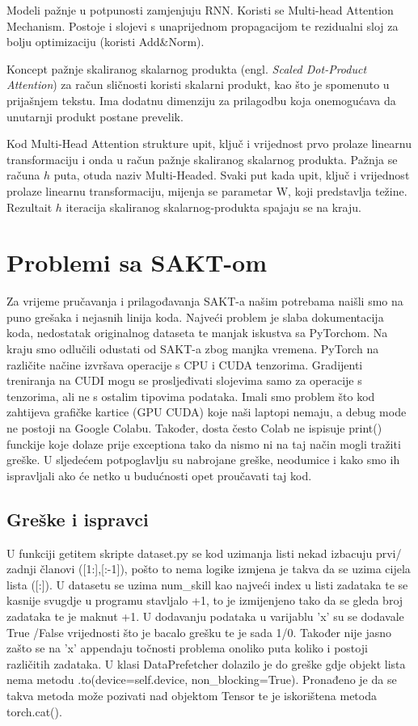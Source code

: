 	Modeli pažnje u potpunosti zamjenjuju RNN. Koristi se Multi-head Attention Mechanism. Postoje i slojevi s unaprijednom propagacijom te rezidualni sloj za bolju optimizaciju (koristi Add\&Norm).

	Koncept pažnje skaliranog skalarnog produkta (engl. \textit{Scaled Dot-Product Attention}) za račun sličnosti koristi skalarni produkt, kao što je spomenuto u prijašnjem tekstu. Ima dodatnu dimenziju za prilagodbu koja onemogućava da unutarnji produkt postane prevelik.

	Kod Multi-Head Attention strukture upit, ključ i vrijednost prvo prolaze linearnu transformaciju i onda u račun pažnje skaliranog skalarnog produkta. Pažnja se računa $h$ puta, otuda naziv Multi-Headed.  Svaki put kada upit, ključ i vrijednost prolaze linearnu transformaciju, mijenja se parametar W, koji predstavlja težine. Rezultait $h$ iteracija skaliranog skalarnog-produkta spajaju se na kraju.


	\section{Problemi sa SAKT-om}
	Za vrijeme pručavanja i prilagođavanja SAKT-a našim potrebama naišli smo na puno grešaka i nejasnih linija koda. Najveći problem je slaba dokumentacija koda, nedostatak originalnog dataseta te manjak iskustva sa PyTorchom.
	Na kraju smo odlučili odustati od SAKT-a zbog manjka vremena. PyTorch na različite načine izvršava operacije s CPU i CUDA tenzorima. Gradijenti treniranja na CUDI mogu se prosljeđivati slojevima samo za operacije s tenzorima, ali ne s ostalim tipovima podataka. Imali smo problem što kod zahtijeva grafičke kartice (GPU CUDA) koje naši laptopi nemaju, a debug mode ne postoji na Google Colabu. Također, dosta često Colab ne ispisuje print() funckije koje dolaze prije exceptiona tako da nismo ni na taj način mogli tražiti greške. U sljedećem potpoglavlju su nabrojane greške, neodumice i kako smo ih ispravljali ako će netko u budućnosti opet proučavati taj kod.
	\subsection{Greške i ispravci}
	
		U funkciji getitem skripte dataset.py se kod uzimanja listi nekad izbacuju prvi/ zadnji članovi ([1:],[:-1]), pošto to nema logike izmjena je takva da se uzima cijela lista ([:]). U datasetu se uzima num\_skill kao najveći index u listi zadataka te se kasnije svugdje u programu stavljalo +1, to je izmijenjeno tako da se gleda broj zadataka te je maknut +1. U dodavanju podataka u varijablu 'x' su se dodavale True /False vrijednosti što je bacalo grešku te je sada 1/0. Također nije jasno zašto se na 'x' appendaju točnosti problema onoliko puta koliko i postoji različitih zadataka. U klasi DataPrefetcher dolazilo je do greške gdje objekt lista nema metodu .to(device=self.device, non\_blocking=True). Pronađeno je da se takva metoda može pozivati nad objektom Tensor te je iskorištena metoda torch.cat().
		
